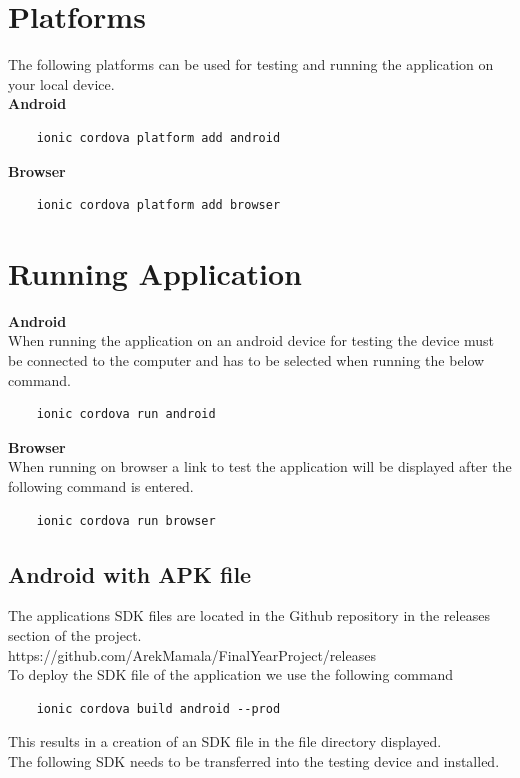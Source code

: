 \documentclass[a4paper,12pt]{report}
\begin{document}
\section{Platforms}
The following platforms can be used for testing and running the application on your local device.\\
\textbf{Android}   
\begin{verbatim}
    ionic cordova platform add android
\end{verbatim}

\textbf{Browser}   
\begin{verbatim}
    ionic cordova platform add browser
\end{verbatim}

\section{Running Application}

\textbf{Android}\\ 
When running the application on an android device for testing the device must be connected to the computer and has to be selected when running the below command.
\begin{verbatim}
    ionic cordova run android
\end{verbatim}

\textbf{Browser}\\   
When running on browser a link to test the application will be displayed after the following command is entered.
\begin{verbatim}
    ionic cordova run browser
\end{verbatim}


\subsection{Android with APK file}
The applications SDK files are located in the Github repository in the releases section of the project.
https://github.com/ArekMamala/FinalYearProject/releases\\

To deploy the SDK file of the application we use the following command
\begin{verbatim}
    ionic cordova build android --prod 
\end{verbatim}
This results in a creation of an SDK file in the file directory displayed.\\
The following SDK needs to be transferred into the testing device and installed.
\end{document}
